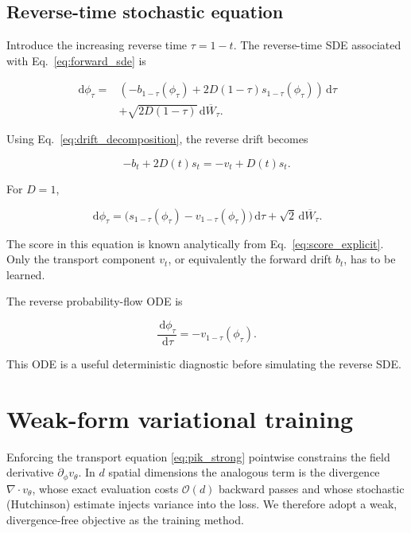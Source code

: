 \documentclass[reprint,twocolumn,superscriptaddress,preprintnumbers,amsmath,amssymb,aps,prd,floatfix]{revtex4-2}
\newcommand{\dd}{\,\mathrm{d}}
\begin{document}
\subsection{Reverse-time stochastic equation}

Introduce the increasing reverse time $\tau=1-t$. The reverse-time SDE associated with Eq.~\eqref{eq:forward_sde} is

\begin{align}
 \dd\phi_\tau
 ={}&
 \left(
 -b_{1-\tau}(\phi_\tau)
 +
 2D(1-\tau)s_{1-\tau}(\phi_\tau)
 \right)\dd\tau
 \nonumber\\
 &+
 \sqrt{2D(1-\tau)}\dd\overline W_\tau.
 \label{eq:reverse_sde_general}
\end{align}

Using Eq.~\eqref{eq:drift_decomposition}, the reverse drift becomes

\begin{equation}
 -b_t+2D(t)s_t
 =
 -v_t+D(t)s_t.
 \label{eq:reverse_drift_decomposition}
\end{equation}

For $D=1$,

\begin{equation}
 \dd\phi_\tau
 =
 \bigl(s_{1-\tau}(\phi_\tau)-v_{1-\tau}(\phi_\tau)\bigr)\dd\tau
 +
 \sqrt{2}\dd\overline W_\tau.
 \label{eq:reverse_sde_unit_diffusion}
\end{equation}

The score in this equation is known analytically from Eq.~\eqref{eq:score_explicit}. Only the transport component $v_t$, or equivalently the forward drift $b_t$, has to be learned.

The reverse probability-flow ODE is

\begin{equation}
 \frac{\dd\phi_\tau}{\dd\tau}
 =
 -v_{1-\tau}(\phi_\tau).
 \label{eq:reverse_probability_flow}
\end{equation}

This ODE is a useful deterministic diagnostic before simulating the reverse SDE.


\section{Weak-form variational training}
\label{sec:weak}

Enforcing the transport equation \eqref{eq:pik_strong} pointwise constrains the
field derivative $\partial_\phi v_\theta$. In $d$ spatial dimensions the
analogous term is the divergence $\nabla\!\cdot v_\theta$, whose exact evaluation
costs $\mathcal{O}(d)$ backward passes and whose stochastic (Hutchinson) estimate
injects variance into the loss. We therefore adopt a weak, divergence-free
objective as the training method.
\end{document}
